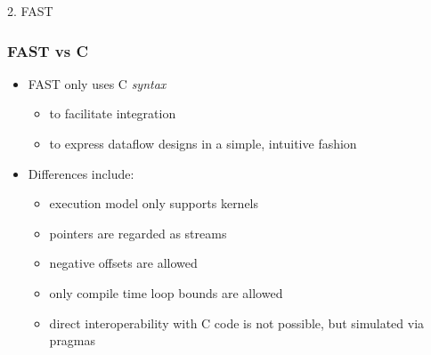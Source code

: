 \begin{frame}{2. FAST}
  \frametitle{FAST vs C}
  \begin{itemize}
  \item FAST only uses C \emph{syntax}
    \begin{itemize}
      \setlength{\itemsep}{5pt}
    \item to facilitate integration
    \item to express dataflow designs in a simple, intuitive fashion
    \end{itemize}
    \vspace{0.5cm}
  \item  Differences include:
    \begin{itemize}
      \setlength{\itemsep}{5pt}
    \item execution model only supports kernels
    \item pointers are regarded as   streams
    \item negative offsets are allowed
    \item only compile time loop bounds are allowed
    \item direct interoperability with C code is not possible, but
      simulated via pragmas
    \end{itemize}
  \end{itemize}

\end{frame}